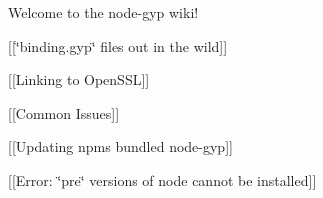 Welcome to the node-\/gyp wiki!


\begin{DoxyItemize}
\item \mbox{[}\mbox{[}\char`\"{}binding.\+gyp\char`\"{} files out in the wild\mbox{]}\mbox{]}
\item \mbox{[}\mbox{[}Linking to Open\+SSL\mbox{]}\mbox{]}
\item \mbox{[}\mbox{[}Common Issues\mbox{]}\mbox{]}
\item \mbox{[}\mbox{[}Updating npm\textquotesingle{}s bundled node-\/gyp\mbox{]}\mbox{]}
\item \mbox{[}\mbox{[}Error\+: \char`\"{}pre\char`\"{} versions of node cannot be installed\mbox{]}\mbox{]} 
\end{DoxyItemize}